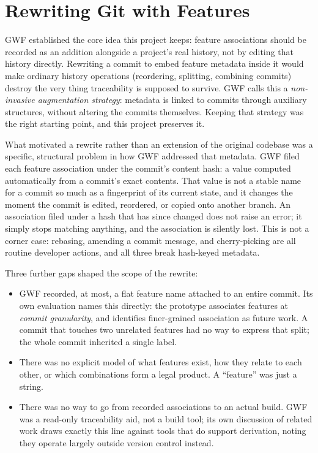 \documentclass[11pt]{article}
\begin{document}
\section{Rewriting Git with Features}
\label{sec:rewrite}

GWF established the core idea this project keeps: feature associations
should be recorded as an addition alongside a project's real history, not
by editing that history directly. Rewriting a commit to embed feature
metadata inside it would make ordinary history operations (reordering,
splitting, combining commits) destroy the very thing traceability is
supposed to survive. GWF calls this a \emph{non-invasive augmentation
strategy}: metadata is linked to commits through auxiliary structures,
without altering the commits themselves. Keeping that strategy was the
right starting point, and this project preserves it.

What motivated a rewrite rather than an extension of the original codebase
was a specific, structural problem in how GWF addressed that metadata. GWF
filed each feature association under the commit's content hash: a value
computed automatically from a commit's exact contents. That value is not a
stable name for a commit so much as a fingerprint of its current state,
and it changes the moment the commit is edited, reordered, or copied onto
another branch. An association filed under a hash that has since changed
does not raise an error; it simply stops matching anything, and the
association is silently lost. This is not a corner case: rebasing,
amending a commit message, and cherry-picking are all routine developer
actions, and all three break hash-keyed metadata.

Three further gaps shaped the scope of the rewrite:

\begin{itemize}[leftmargin=1.4em]
  \item GWF recorded, at most, a flat feature name attached to an entire
    commit. Its own evaluation names this directly: the prototype
    associates features at \emph{commit granularity}, and identifies
    finer-grained association as future work. A commit that touches two
    unrelated features had no way to express that split; the whole commit
    inherited a single label.
  \item There was no explicit model of what features exist, how they
    relate to each other, or which combinations form a legal product. A
    ``feature'' was just a string.
  \item There was no way to go from recorded associations to an actual
    build. GWF was a read-only traceability aid, not a build tool; its own
    discussion of related work draws exactly this line against tools that
    do support derivation, noting they operate largely outside version
    control instead.
  \end{itemize}
\end{document}
